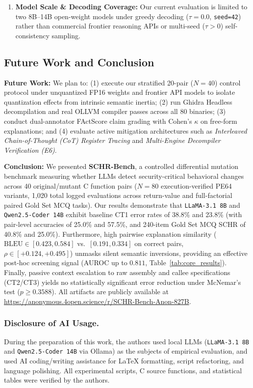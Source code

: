 \documentclass[runningheads]{llncs}
\begin{document}
\begin{enumerate}
    \item \textbf{Model Scale \& Decoding Coverage:} Our current evaluation is limited to two 8B--14B open-weight models under greedy decoding ($\tau = 0.0$, \texttt{seed=42}) rather than commercial frontier reasoning APIs or multi-seed ($\tau > 0$) self-consistency sampling.
\end{enumerate}

\subsection{Future Work and Conclusion}
\textbf{Future Work:} We plan to: (1) execute our stratified 20-pair ($N=40$) control protocol under unquantized FP16 weights and frontier API models to isolate quantization effects from intrinsic semantic inertia; (2) run Ghidra Headless decompilation and real OLLVM compiler passes across all 80 binaries; (3) conduct dual-annotator FActScore claim grading with Cohen's $\kappa$ on free-form explanations; and (4) evaluate active mitigation architectures such as \textit{Interleaved Chain-of-Thought (CoT) Register Tracing} and \textit{Multi-Engine Decompiler Verification (E6)}.

\textbf{Conclusion:} We presented \textbf{SCHR-Bench}, a controlled differential mutation benchmark measuring whether LLMs detect security-critical behavioral changes across 40 original/mutant C function pairs ($N=80$ execution-verified PE64 variants, 1,020 total logged evaluations across return-value and full-factorial paired Gold Set MCQ tasks). Our results demonstrate that \texttt{LLaMA-3.1 8B} and \texttt{Qwen2.5-Coder 14B} exhibit baseline CT1 error rates of 38.8\% and 23.8\% (with pair-level accuracies of 25.0\% and 57.5\%, and 240-item Gold Set MCQ SCHR of 40.8\% and 25.0\%). Furthermore, high pairwise explanation similarity ($\text{BLEU} \in [0.423, 0.584]$ vs.\ $[0.191, 0.334]$ on correct pairs, $\rho \in [+0.124, +0.495]$) unmasks silent semantic inversions, providing an effective post-hoc screening signal (AUROC up to $0.811$, Table~\ref{tab:core_results}). Finally, passive context escalation to raw assembly and callee specifications (CT2/CT3) yields no statistically significant error reduction under McNemar's test ($p \ge 0.3588$). All artifacts are publicly available at \url{https://anonymous.4open.science/r/SCHR-Bench-Anon-827B}.

\subsubsection*{Disclosure of AI Usage.} During the preparation of this work, the authors used local LLMs (\texttt{LLaMA-3.1 8B} and \texttt{Qwen2.5-Coder 14B} via Ollama) as the subjects of empirical evaluation, and used AI coding/writing assistance for LaTeX formatting, script refactoring, and language polishing. All experimental scripts, C source functions, and statistical tables were verified by the authors.



\end{document}
